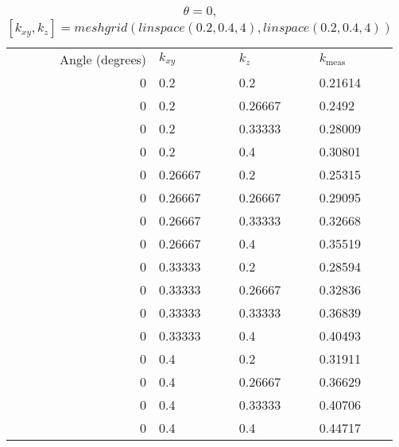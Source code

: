 \begin{table}
\caption{\(\theta=0\), \([k_{xy}, k_z] = meshgrid(linspace(0.2, 0.4, 4), linspace(0.2, 0.4, 4))\)}
\begin{tabular}{r l l | l}
Angle (degrees) & \(k_{xy}\) & \(k_z\) & \(k_{\textrm{meas}}\)\\
0 & 0.2 & 0.2 & 0.21614\\
0 & 0.2 & 0.26667 & 0.2492\\
0 & 0.2 & 0.33333 & 0.28009\\
0 & 0.2 & 0.4 & 0.30801\\
0 & 0.26667 & 0.2 & 0.25315\\
0 & 0.26667 & 0.26667 & 0.29095\\
0 & 0.26667 & 0.33333 & 0.32668\\
0 & 0.26667 & 0.4 & 0.35519\\
0 & 0.33333 & 0.2 & 0.28594\\
0 & 0.33333 & 0.26667 & 0.32836\\
0 & 0.33333 & 0.33333 & 0.36839\\
0 & 0.33333 & 0.4 & 0.40493\\
0 & 0.4 & 0.2 & 0.31911\\
0 & 0.4 & 0.26667 & 0.36629\\
0 & 0.4 & 0.33333 & 0.40706\\
0 & 0.4 & 0.4 & 0.44717\\
\end{tabular}
\end{table}

